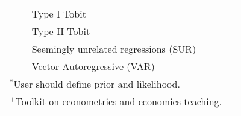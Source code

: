 \begin{table}[!ht]
{{\begin{tabular}{|l|l|l|c|}
                                                                 &                                              & Type I Tobit                                                   &                                                                     \\
                                                                 &                                              & Type II Tobit                                                  &                                                                     \\
                                                                 &                                              & Seemingly unrelated regressions (SUR)                          &                                                                     \\
                                                                 &                                              & Vector Autoregressive (VAR)                                        &                                                                     \\ \hline
\multicolumn{3}{l}{$^*$User should define prior and likelihood.}\\
\multicolumn{3}{l}{$^{+}$Toolkit on econometrics and economics teaching.}
\end{tabular}
}}
\end{table}
